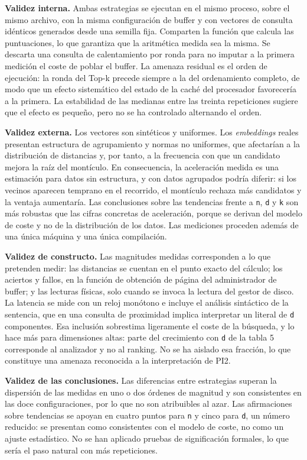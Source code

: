 \documentclass[11pt,a4paper]{article}
\begin{document}
\textbf{Validez interna.} Ambas estrategias se ejecutan en el mismo
proceso, sobre el mismo archivo, con la misma configuración de buffer y
con vectores de consulta idénticos generados desde una semilla fija.
Comparten la función que calcula las puntuaciones, lo que garantiza que
la aritmética medida sea la misma. Se descarta una consulta de
calentamiento por ronda para no imputar a la primera medición el coste
de poblar el buffer. La amenaza residual es el orden de ejecución: la
ronda del Top-k precede siempre a la del ordenamiento completo, de modo
que un efecto sistemático del estado de la caché del procesador
favorecería a la primera. La estabilidad de las medianas entre las
treinta repeticiones sugiere que el efecto es pequeño, pero no se ha
controlado alternando el orden.

\textbf{Validez externa.} Los vectores son sintéticos y uniformes. Los
\emph{embeddings} reales presentan estructura de agrupamiento y normas
no uniformes, que afectarían a la distribución de distancias y, por
tanto, a la frecuencia con que un candidato mejora la raíz del
montículo. En consecuencia, la aceleración medida es una estimación para
datos sin estructura, y con datos agrupados podría diferir: si los
vecinos aparecen temprano en el recorrido, el montículo rechaza más
candidatos y la ventaja aumentaría. Las conclusiones sobre las
tendencias frente a \texttt{n}, \texttt{d} y \texttt{k} son más robustas
que las cifras concretas de aceleración, porque se derivan del modelo de
coste y no de la distribución de los datos. Las mediciones proceden
además de una única máquina y una única compilación.

\textbf{Validez de constructo.} Las magnitudes medidas corresponden a lo
que pretenden medir: las distancias se cuentan en el punto exacto del
cálculo; los aciertos y fallos, en la función de obtención de página del
administrador de buffer; y las lecturas físicas, solo cuando se invoca
la lectura del gestor de disco. La latencia se mide con un reloj
monótono e incluye el análisis sintáctico de la sentencia, que en una
consulta de proximidad implica interpretar un literal de \texttt{d}
componentes. Esa inclusión sobrestima ligeramente el coste de la
búsqueda, y lo hace más para dimensiones altas: parte del crecimiento
con \texttt{d} de la tabla 5 corresponde al analizador y no al ranking.
No se ha aislado esa fracción, lo que constituye una amenaza reconocida
a la interpretación de PI2.

\textbf{Validez de las conclusiones.} Las diferencias entre estrategias
superan la dispersión de las medidas en uno o dos órdenes de magnitud y
son consistentes en las doce configuraciones, por lo que no son
atribuibles al azar. Las afirmaciones sobre tendencias se apoyan en
cuatro puntos para \texttt{n} y cinco para \texttt{d}, un número
reducido: se presentan como consistentes con el modelo de coste, no como
un ajuste estadístico. No se han aplicado pruebas de significación
formales, lo que sería el paso natural con más repeticiones.
\end{document}
